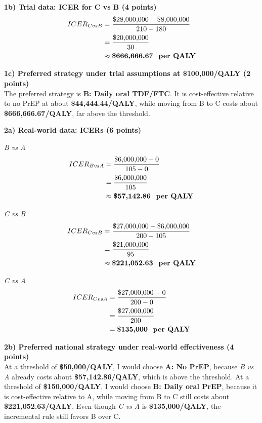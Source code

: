 \documentclass[11pt, letterpaper]{article}
\begin{document}
\textbf{1b) Trial data: ICER for C vs B (4 points)} \\
\begin{align*}
ICER_{C vs B} &= \frac{\$28{,}000{,}000 - \$8{,}000{,}000}{210 - 180} \\
&= \frac{\$20{,}000{,}000}{30} \\
&\approx \textbf{\$666{,}666.67 \text{ per QALY}}
\end{align*}

\textbf{1c) Preferred strategy under trial assumptions at \$100,000/QALY (2 points)} \\
The preferred strategy is \textbf{B: Daily oral TDF/FTC}. It is cost-effective relative to no PrEP at about \textbf{\$44,444.44/QALY}, while moving from B to C costs about \textbf{\$666,666.67/QALY}, far above the threshold.

\textbf{2a) Real-world data: ICERs (6 points)}

\textit{B vs A}
\begin{align*}
ICER_{B vs A} &= \frac{\$6{,}000{,}000 - 0}{105 - 0} \\
&= \frac{\$6{,}000{,}000}{105} \\
&\approx \textbf{\$57{,}142.86 \text{ per QALY}}
\end{align*}

\textit{C vs B}
\begin{align*}
ICER_{C vs B} &= \frac{\$27{,}000{,}000 - \$6{,}000{,}000}{200 - 105} \\
&= \frac{\$21{,}000{,}000}{95} \\
&\approx \textbf{\$221{,}052.63 \text{ per QALY}}
\end{align*}

\textit{C vs A}
\begin{align*}
ICER_{C vs A} &= \frac{\$27{,}000{,}000 - 0}{200 - 0} \\
&= \frac{\$27{,}000{,}000}{200} \\
&= \textbf{\$135{,}000 \text{ per QALY}}
\end{align*}

\textbf{2b) Preferred national strategy under real-world effectiveness (4 points)} \\
At a threshold of \textbf{\$50,000/QALY}, I would choose \textbf{A: No PrEP}, because \textit{B vs A} already costs about \textbf{\$57,142.86/QALY}, which is above the threshold. At a threshold of \textbf{\$150,000/QALY}, I would choose \textbf{B: Daily oral PrEP}, because it is cost-effective relative to A, while moving from B to C still costs about \textbf{\$221,052.63/QALY}. Even though \textit{C vs A} is \textbf{\$135,000/QALY}, the incremental rule still favors B over C.
\end{document}
